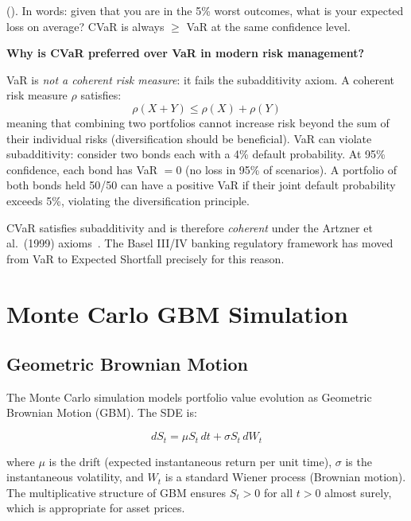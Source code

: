 (). In words: given that you are in the 5\% worst outcomes, what is your expected loss on average? CVaR is always $\geq$ VaR at the same confidence level.

\begin{challengebox}
  \textbf{Why is CVaR preferred over VaR in modern risk management?}

  VaR is \emph{not a coherent risk measure}: it fails the subadditivity axiom. A coherent risk measure $\rho$ satisfies:
  \[
    \rho(X + Y) \leq \rho(X) + \rho(Y)
  \]
  meaning that combining two portfolios cannot increase risk beyond the sum of their individual risks (diversification should be beneficial). VaR can violate subadditivity: consider two bonds each with a 4\% default probability. At 95\% confidence, each bond has VaR $= 0$ (no loss in 95\% of scenarios). A portfolio of both bonds held 50/50 can have a positive VaR if their joint default probability exceeds 5\%, violating the diversification principle.

  CVaR satisfies subadditivity and is therefore \emph{coherent} under the Artzner et al.\ (1999) axioms~\cite{artzner1999}. The Basel III/IV banking regulatory framework has moved from VaR to Expected Shortfall precisely for this reason.
\end{challengebox}

\section{Monte Carlo GBM Simulation}
\label{sec:portfolio-montecarlo}


\subsection{Geometric Brownian Motion}

The Monte Carlo simulation models portfolio value evolution as Geometric Brownian Motion (GBM). The SDE is:

\begin{equation}
  dS_t = \mu S_t \, dt + \sigma S_t \, dW_t
  \label{eq:gbm-sde}
\end{equation}

where $\mu$ is the drift (expected instantaneous return per unit time), $\sigma$ is the instantaneous volatility, and $W_t$ is a standard Wiener process (Brownian motion). The multiplicative structure of GBM ensures $S_t > 0$ for all $t > 0$ almost surely, which is appropriate for asset prices.

